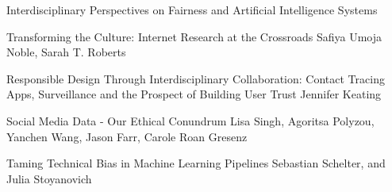 \documentclass[11pt]{article}
\begin{document}
\begin{bulletin}
\begin{articlesection}{Interdisciplinary Perspectives on Fairness and Artificial Intelligence Systems}
%
%

\makeatletter
\renewcommand{\AB@affillist}{}
\renewcommand{\AB@authlist}{}
\setcounter{authors}{0}
\makeatother

\begin{article}
{Transforming the Culture: Internet Research at the Crossroads}
{Safiya Umoja Noble, Sarah T. Roberts}
\graphicspath{{submissions/NobleRoberts_final/}}

\end{article}

\makeatletter
\renewcommand{\AB@affillist}{}
\renewcommand{\AB@authlist}{}
\setcounter{authors}{0}
\makeatother

\begin{article}
{Responsible Design Through Interdisciplinary Collaboration: Contact Tracing Apps, Surveillance and the Prospect of Building User Trust}
{Jennifer Keating}
\graphicspath{{submissions/Keating_final/}}

\end{article}

\makeatletter
\renewcommand{\AB@affillist}{}
\renewcommand{\AB@authlist}{}
\setcounter{authors}{0}
\makeatother

\begin{article}
{Social Media Data - Our Ethical Conundrum}
{Lisa Singh, Agoritsa Polyzou, Yanchen Wang, Jason Farr, Carole Roan Gresenz}
\graphicspath{{submissions/Singh_final/figs}}

\end{article}

\makeatletter
\renewcommand{\AB@affillist}{}
\renewcommand{\AB@authlist}{}
\setcounter{authors}{0}
\makeatother

\begin{article}
{Taming Technical Bias in Machine Learning Pipelines}
{Sebastian Schelter, and Julia Stoyanovich}
\graphicspath{{submissions/SchelterStoyanovich_final/figs/}}

\end{article}

\makeatletter
\renewcommand{\AB@affillist}{}
\renewcommand{\AB@authlist}{}
\setcounter{authors}{0}
\makeatother


\end{articlesection}
\end{bulletin}
\end{document}
